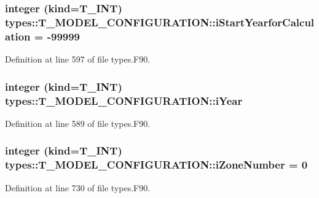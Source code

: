 \hypertarget{typetypes_1_1_t___m_o_d_e_l___c_o_n_f_i_g_u_r_a_t_i_o_n_adbf87a23506af5cf11fa0ffca4dec91d}{
\subsubsection[{iStartYearforCalculation}]{\setlength{\rightskip}{0pt plus 5cm}integer (kind={\bf T\_\-INT}) {\bf types::T\_\-MODEL\_\-CONFIGURATION::iStartYearforCalculation} = -\/99999}}
\label{typetypes_1_1_t___m_o_d_e_l___c_o_n_f_i_g_u_r_a_t_i_o_n_adbf87a23506af5cf11fa0ffca4dec91d}


Definition at line 597 of file types.F90.

\hypertarget{typetypes_1_1_t___m_o_d_e_l___c_o_n_f_i_g_u_r_a_t_i_o_n_a485ce8a8aa6a892ba29008cd882d2af9}{
\subsubsection[{iYear}]{\setlength{\rightskip}{0pt plus 5cm}integer (kind={\bf T\_\-INT}) {\bf types::T\_\-MODEL\_\-CONFIGURATION::iYear}}}
\label{typetypes_1_1_t___m_o_d_e_l___c_o_n_f_i_g_u_r_a_t_i_o_n_a485ce8a8aa6a892ba29008cd882d2af9}


Definition at line 589 of file types.F90.

\hypertarget{typetypes_1_1_t___m_o_d_e_l___c_o_n_f_i_g_u_r_a_t_i_o_n_a48d2fb845a138044667778ecbe9b8b6d}{
\subsubsection[{iZoneNumber}]{\setlength{\rightskip}{0pt plus 5cm}integer (kind={\bf T\_\-INT}) {\bf types::T\_\-MODEL\_\-CONFIGURATION::iZoneNumber} = 0}}
\label{typetypes_1_1_t___m_o_d_e_l___c_o_n_f_i_g_u_r_a_t_i_o_n_a48d2fb845a138044667778ecbe9b8b6d}


Definition at line 730 of file types.F90.


